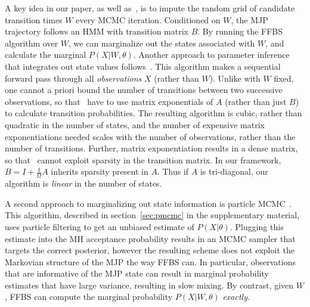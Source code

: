 A key idea in our paper, as well as~\cite{RaoTeh13}, is to impute the random grid of candidate transition times $W$ every MCMC iteration. 
Conditioned on $W$, the MJP trajectory follows an HMM with transition matrix $B$. 
By running the FFBS algorithm over $W$, we can marginalize out the states associated with $W$, and calculate the marginal $P(X|W,\theta)$. 
Another approach to parameter inference that integrates out state values follows~\citet{FearnSher2006}. 
 This algorithm makes a sequential forward pass through all {\em observations} $X$ (rather than $W$). 
 Unlike with $W$ fixed, one cannot a priori bound the number of transitions between two successive observations, so that~\citet{FearnSher2006} have to use matrix exponentials of $A$ (rather than just $B$) to calculate transition probabilities.
 The resulting algorithm is cubic, rather than quadratic in the number of states, and the number of expensive matrix exponentiations needed scales with the number of observations, rather than the number of transitions.
 Further, matrix exponentiation results in a dense matrix, so that~\cite{FearnSher2006} cannot exploit sparsity in the transition matrix.
 In our framework, $B=I+\frac{1}{\Omega}A$ inherits sparsity present in $A$. Thus if $A$ is tri-diagonal, our algorithm is {\em linear} in the number of states.

 A second approach to marginalizing out state information is particle MCMC~\citep{Andrieu10}. 
 This algorithm, described in section~\ref{sec:pmcmc} in the supplementary material, uses particle filtering to get an unbiased estimate of $P(X|\theta)$. 
 Plugging this estimate into the MH acceptance probability results in an MCMC sampler that targets the correct posterior, however the resulting scheme does not exploit the Markovian structure of the MJP the way FFBS can. 
 In particular, observations that are informative of the MJP state can result in marginal probability estimates that have large variance, resulting in slow mixing. 
 By contrast, given $W$, FFBS can compute the marginal probability $P(X|W,\theta)$ {\em exactly}. 

